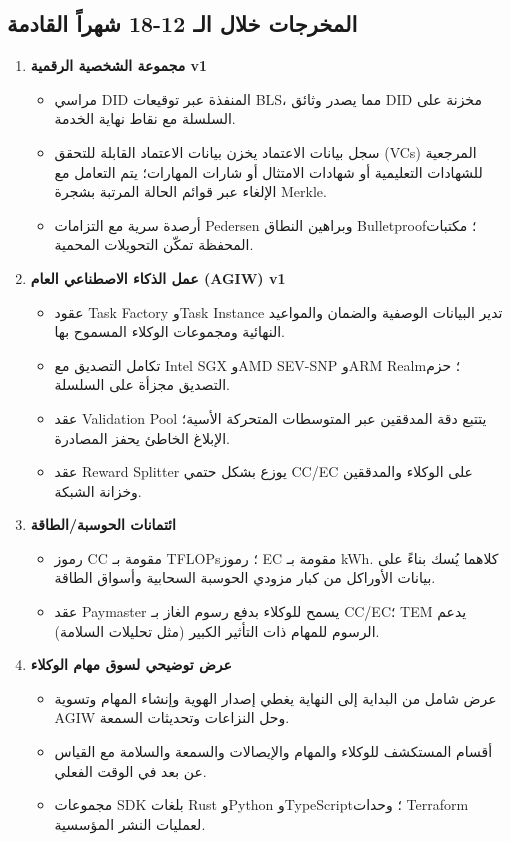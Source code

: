 \documentclass[11pt]{article}
\begin{document}
\subsection{المخرجات خلال الـ 12-18 شهراً القادمة}
\begin{enumerate}[label=\textbf{D\arabic*.}, leftmargin=*]
  \item \textbf{مجموعة الشخصية الرقمية v1}
  \begin{itemize}[noitemsep]
    \item مراسي DID المنفذة عبر توقيعات BLS، مما يصدر وثائق DID مخزنة على السلسلة مع نقاط نهاية الخدمة.
    \item سجل بيانات الاعتماد يخزن بيانات الاعتماد القابلة للتحقق (VCs) المرجعية للشهادات التعليمية أو شهادات الامتثال أو شارات المهارات؛ يتم التعامل مع الإلغاء عبر قوائم الحالة المرتبة بشجرة Merkle.
    \item أرصدة سرية مع التزامات Pedersen وبراهين النطاق Bulletproof؛ مكتبات المحفظة تمكّن التحويلات المحمية.
  \end{itemize}
  \item \textbf{عمل الذكاء الاصطناعي العام (AGIW) v1}
  \begin{itemize}[noitemsep]
    \item عقود Task Factory وTask Instance تدير البيانات الوصفية والضمان والمواعيد النهائية ومجموعات الوكلاء المسموح بها.
    \item تكامل التصديق مع Intel SGX وAMD SEV-SNP وARM Realm؛ حزم التصديق مجزأة على السلسلة.
    \item عقد Validation Pool يتتبع دقة المدققين عبر المتوسطات المتحركة الأسية؛ الإبلاغ الخاطئ يحفز المصادرة.
    \item عقد Reward Splitter يوزع بشكل حتمي CC/EC على الوكلاء والمدققين وخزانة الشبكة.
  \end{itemize}
  \item \textbf{ائتمانات الحوسبة/الطاقة}
  \begin{itemize}[noitemsep]
    \item رموز CC مقومة بـ TFLOPs؛ رموز EC مقومة بـ kWh. كلاهما يُسك بناءً على بيانات الأوراكل من كبار مزودي الحوسبة السحابية وأسواق الطاقة.
    \item عقد Paymaster يسمح للوكلاء بدفع رسوم الغاز بـ CC/EC؛ TEM يدعم الرسوم للمهام ذات التأثير الكبير (مثل تحليلات السلامة).
  \end{itemize}
  \item \textbf{عرض توضيحي لسوق مهام الوكلاء}
  \begin{itemize}[noitemsep]
    \item عرض شامل من البداية إلى النهاية يغطي إصدار الهوية وإنشاء المهام وتسوية AGIW وحل النزاعات وتحديثات السمعة.
    \item أقسام المستكشف للوكلاء والمهام والإيصالات والسمعة والسلامة مع القياس عن بعد في الوقت الفعلي.
    \item مجموعات SDK بلغات Rust وPython وTypeScript؛ وحدات Terraform لعمليات النشر المؤسسية.
  \end{itemize}
\end{enumerate}
\end{document}
